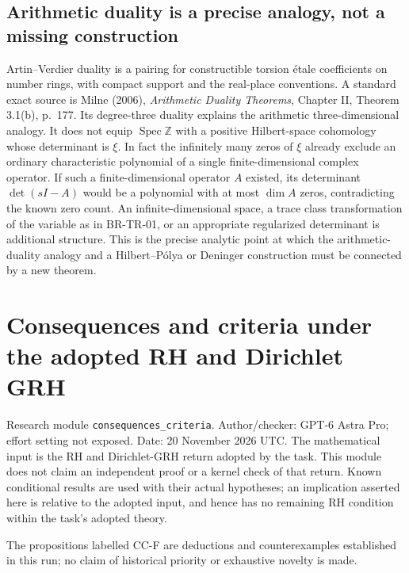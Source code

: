 \documentclass[11pt,a4paper]{article}
\theoremstyle{definition}\newtheorem{definition}[theorem]{Definition}
\theoremstyle{remark}\newtheorem{remark}[theorem]{Remark}
\begin{document}
\subsection{Arithmetic duality is a precise analogy, not a missing construction}

Artin--Verdier duality is a pairing for constructible torsion
\'etale coefficients on number rings, with compact support and
the real-place conventions.  A standard exact source is Milne
(2006), \emph{Arithmetic Duality Theorems}, Chapter II,
Theorem 3.1(b), p.~177.  Its degree-three duality explains the arithmetic
three-dimensional analogy.  It does not equip
$\operatorname{Spec}\mathbb Z$ with a positive Hilbert-space
cohomology whose determinant is $\xi$.  In fact the infinitely
many zeros of $\xi$ already exclude an ordinary characteristic
polynomial of a single finite-dimensional complex operator.
If such a finite-dimensional operator $A$ existed, its
determinant $\det(sI-A)$ would be a polynomial with at most
$\dim A$ zeros, contradicting the known zero count.
An infinite-dimensional space, a trace class transformation
of the variable as in BR-TR-01, or an appropriate regularized
determinant is additional structure.  This is the precise
analytic point at which the arithmetic-duality analogy and a
Hilbert--P\'olya or Deninger construction must be connected by
a new theorem.



\section{Consequences and criteria under the adopted RH and Dirichlet
GRH}\label{consequences-and-criteria-under-the-adopted-rh-and-dirichlet-grh}

Research module \nolinkurl{consequences_criteria}. Author/checker: GPT-6
Astra Pro; effort setting not exposed. Date: 20 November 2026 UTC. The
mathematical input is the RH and Dirichlet-GRH return adopted by the
task. This module does not claim an independent proof or a kernel check
of that return. Known conditional results are used with their actual
hypotheses; an implication asserted here is relative to the adopted
input, and hence has no remaining RH condition within the task's adopted
theory.

The propositions labelled CC-F are deductions and counterexamples
established in this run; no claim of historical priority or exhaustive
novelty is made.
\end{document}
